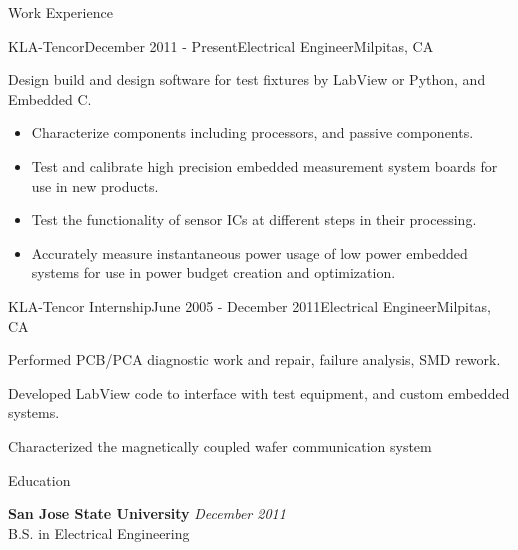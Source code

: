 \documentclass{resume} %
\begin{document}
\begin{rSection}{Work Experience}
\begin{rSubsection}{KLA-Tencor}{December 2011 - Present}{Electrical Engineer}{Milpitas, CA}
\item Design build and design software for test fixtures by LabView or Python, and Embedded C.
\begin{itemize}
\itemsep -0.5em \vspace{-0.5em}
\renewcommand{\labelitemi}{-}
\item Characterize components including processors, and passive components.
\item Test and calibrate high precision embedded measurement system boards for use in new products.
\item Test the functionality of sensor ICs at different steps in their processing.
\item Accurately measure instantaneous power usage of low power embedded systems for use in power budget creation and optimization.
\end{itemize}


\end{rSubsection}


\begin{rSubsection}{KLA-Tencor Internship}{June 2005 - December 2011}{Electrical Engineer}{Milpitas, CA}
\item Performed PCB/PCA diagnostic work and repair, failure analysis, SMD rework.
\item Developed LabView code to interface with test equipment, and custom embedded systems.
\item Characterized the magnetically coupled wafer communication system
\end{rSubsection}

\end{rSection}


\begin{rSection}{Education}

{\bf San Jose State University} \hfill {\em December 2011} \\ 
B.S. in Electrical Engineering \\

\end{rSection}





\end{document}
